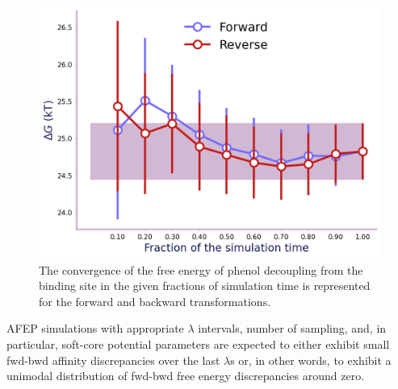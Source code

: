 \documentclass[9pt,tutorial]{livecoms}
\begin{document}
\begin{figure}[h!t]
\centering
\includegraphics[width=0.85\linewidth]{Supp-Files/AFEP-Bound-Decoupling/output/Alchemlyb/output_5_0.png}
\caption{The convergence of the free energy of phenol decoupling from the binding site in the given fractions of simulation time is represented for the forward and backward transformations.}
\label{fig:AFEP-decoupl2}
\end{figure}

AFEP simulations with appropriate {$\lambda$} intervals, number of sampling, and, in particular, soft-core potential parameters are expected to either exhibit small fwd-bwd affinity discrepancies over the last {$\lambda$}s or, in other words, to exhibit a unimodal distribution of fwd-bwd free energy discrepancies around zero.
\end{document}
